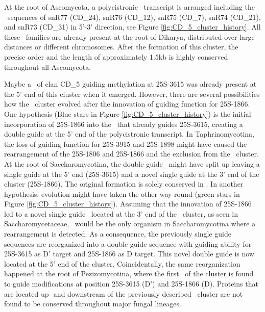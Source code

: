At the root of Ascomycota, a polycistronic \sno\ transcript is
arranged including the \sno\ sequences of snR77 (CD\_24), snR76
(CD\_12), snR75 (CD\_7), snR74 (CD\_21), and snR73 (CD\_31) in 5'-3'
direction, see Figure \ref{fig:CD_5_cluster_history}.  All these \sno\
families are already present at the root of Dikarya, distributed over
large distances or different chromosomes. After the formation of this
cluster, the precise order and the length of approximately 1.5kb is
highly conserved throughout all Ascomycota.

Maybe a \sno\ of clan CD\_5 guiding methylation at 25S-3615 was
already present at the 5' end of this cluster when it
emerged. However, there are several possibilities how the \sno\
cluster evolved after the innovation of guiding function for 25S-1866.
One hypothesis (Blue stars in Figure \ref{fig:CD_5_cluster_history})
is the initial incorporation of 25S-1866 into the \sno\ that already
guides 25S-3615, creating a double guide \sno at the 5' end of the
polycistronic transcript. In Taphrinomycotina, the loss of guiding
function for 25S-3915 and 25S-1898 might have caused the rearrangement
of the 25S-1806 and 25S-1866 and the exclusion from the \sno\
cluster. At the root of Saccharomycotina, the double guide \sno\ might
have split up leaving a single guide at the 5' end (25S-3615) and a
novel single guide at the 3' end of the cluster (25S-1866). The
original formation is solely conserved in \Yli. In another hypothesis,
evolution might have taken the other way round (green stars in Figure
\ref{fig:CD_5_cluster_history}). Assuming that the innovation of
25S-1866 led to a novel single guide \sno\ located at the 3' end of
the \sno\ cluster, as seen in Saccharomycetaceae, \yli\ would be the
only organism in Saccharomycotina where a rearrangement is
detected. As a consequence, the previously single guide sequences are
reorganized into a double guide sequence with guiding ability for
25S-3615 as D' target and 25S-1866 as D target. This novel double
guide is now located at the 5' end of the cluster.  Coincidentally,
the same reorganization happened at the root of Pezizomycotina, where
the first \sno\ of the cluster is found to guide modifications at
position 25S-3615 (D') and 25S-1866 (D). Proteins that are located up-
and downstream of the previously described \sno\ cluster are not found
to be conserved throughout major fungal lineages.

